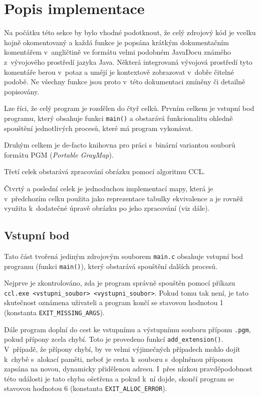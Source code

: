 \section{Popis implementace}

Na počátku této sekce by bylo vhodné podotknout, že celý zdrojový kód je vcelku hojně okomentovaný a každá funkce je
popsána krátkým dokumentačním komentářem v~angličtině ve formátu velmi podobném JavaDocu známého z~vývojového prostředí
jazyka Java. Některá integrovaná vývojová prostředí tyto komentáře berou v~potaz a umějí je kontextově zobrazovat
v~dobře čitelné podobě. Ne všechny funkce jsou proto v~této dokumentaci zmíněny či detailně popisovány.

\vspace{0.5cm}

Lze říci, že celý program je rozdělen do čtyř celků. Prvním celkem je vstupní bod programu, který obsahuje funkci
\verb|main()| a obstarává funkcionalitu ohledně spouštění jednotlivých procesů, které má program vykonávat.

Druhým celkem je de-facto knihovna pro práci s~binární variantou souborů formátu PGM (\textit{Portable GrayMap}).

Třetí celek obstarává zpracování obrázku pomocí algoritmu CCL.

Čtvrtý a poslední celek je jednoduchou implementací mapy, která je v~předchozím celku použita jako reprezentace tabulky
ekvivalence a je rovněž využita k~dodatečné úpravě obrázku po jeho zpracování (viz dále).


\subsection{Vstupní bod}

Tato část tvořená jediným zdrojovým souborem \verb|main.c| obsahuje vstupní bod programu (funkci \verb|main()|), který
obstarává spouštění dalších procesů.

Nejprve je zkontrolováno, zda je program správně spouštěn pomocí příkazu
\verb|ccl.exe <vstupni_soubor> <vystupni_soubor>|. Pokud tomu tak není, je tato skutečnost oznámena uživateli a program
končí se stavovou hodnotou 1 (konstanta \verb|EXIT_MISSING_ARGS|).

Dále program doplní do cest ke vstupnímu a výstupnímu souboru příponu \verb|.pgm|, pokud přípony zcela chybí. Toto je
provedeno funkcí \verb|add_extension()|. V~případě, že přípony chybí, by ve velmi výjimečných případech mohlo dojít
k~chybě s~alokací paměti, neboť je cesta k~souboru s~doplněnou příponou zapsána na novou, dynamicky přidělenou adresu.
I~přes nízkou pravděpodobnost této události je tato chyba ošetřena a pokud k~ní dojde, skončí program se stavovou
hodnotou 6 (konstanta \verb|EXIT_ALLOC_ERROR|).

